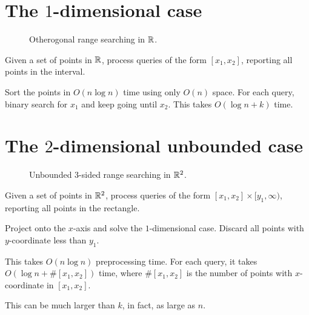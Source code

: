 \section{The $1$-dimensional case} \label{sec:ors:1d}
\begin{figure}[t]
    \centering
    \caption{Otherogonal range searching in $\mathbb{R}$.}
    \label{fig:ors:1d}
\end{figure}
\begin{question*}
    Given a set of points in $\mathbb{R}$,
    process queries of the form $[x_1, x_2]$,
    reporting all points in the interval.
\end{question*}
\begin{solution}
    Sort the points in $O(n \log n)$ time using only $O(n)$ space.
    For each query, binary search for $x_1$ and keep going until $x_2$.
    This takes $O(\log n + k)$ time.
\end{solution}

\section{The $2$-dimensional unbounded case} \label{sec:ors:2d-unbounded}
\begin{figure}[b]
    \centering
    \caption{Unbounded $3$-sided range searching in $\mathbb{R}^2$.}
    \label{fig:ors:2d-unbounded}
\end{figure}
\begin{question*}
    Given a set of points in $\mathbb{R}^2$,
    process queries of the form $[x_1, x_2] \times [y_1, \infty)$,
    reporting all points in the rectangle.
\end{question*}
\begin{solution}[Naive]
    Project onto the $x$-axis and solve the $1$-dimensional case.
    Discard all points with $y$-coordinate less than $y_1$.

    This takes $O(n \log n)$ preprocessing time.
    For each query, it takes $O(\log n + \#[x_1, x_2])$ time,
    where $\#[x_1, x_2]$ is the number of points with $x$-coordinate
    in $[x_1, x_2]$.
\end{solution}
This can be much larger than $k$, in fact, as large as $n$.

